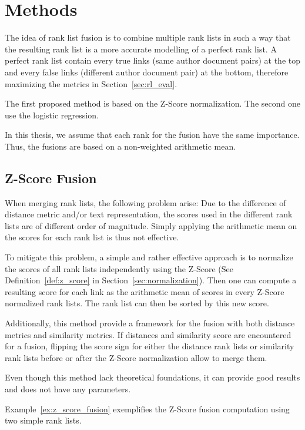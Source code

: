 \section{Methods \label{sec:rank_lists_fusion}}

The idea of rank list fusion is to combine multiple rank lists in such a way that the resulting rank list is a more accurate modelling of a perfect rank list.
A perfect rank list contain every true links (same author document pairs) at the top and every false links (different author document pair) at the bottom, therefore maximizing the metrics in Section~\ref{sec:rl_eval}.

The first proposed method is based on the Z-Score normalization.
The second one use the logistic regression.

In this thesis, we assume that each rank for the fusion have the same importance.
Thus, the fusions are based on a non-weighted arithmetic mean.

\subsection{Z-Score Fusion}

When merging rank lists, the following problem arise: Due to the difference of distance metric and/or text representation, the scores used in the different rank lists are of different order of magnitude.
Simply applying the arithmetic mean on the scores for each rank list is thus not effective.

To mitigate this problem, a simple and rather effective approach is to normalize the scores of all rank lists independently using the Z-Score (See Definition~\ref{def:z_score} in Section~\ref{sec:normalization}).
Then one can compute a resulting score for each link as the arithmetic mean of scores in every Z-Score normalized rank lists.
The rank list can then be sorted by this new score.

Additionally, this method provide a framework for the fusion with both distance metrics and similarity metrics.
If distances and similarity score are encountered for a fusion, flipping the score sign for either the distance rank lists or similarity rank lists before or after the Z-Score normalization allow to merge them.

Even though this method lack theoretical foundations, it can provide good results and does not have any parameters.

Example~\ref{ex:z_score_fusion} exemplifies the Z-Score fusion computation using two simple rank lists.

